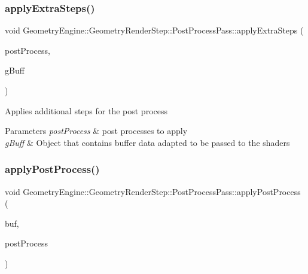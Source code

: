 \subsubsection{\texorpdfstring{applyExtraSteps()}{applyExtraSteps()}}
{\footnotesize\ttfamily void Geometry\+Engine\+::\+Geometry\+Render\+Step\+::\+Post\+Process\+Pass\+::apply\+Extra\+Steps (\begin{DoxyParamCaption}\item[{\mbox{\hyperlink{class_geometry_engine_1_1_geometry_post_process_1_1_post_process}{Geometry\+Post\+Process\+::\+Post\+Process}} $\ast$}]{post\+Process,  }\item[{const \mbox{\hyperlink{class_geometry_engine_1_1_g_buffer_texture_info}{G\+Buffer\+Texture\+Info}} \&}]{g\+Buff }\end{DoxyParamCaption})\hspace{0.3cm}{\ttfamily [protected]}}

Applies additional steps for the post process 
\begin{DoxyParams}{Parameters}
{\em post\+Process} & post processes to apply \\
\hline
{\em g\+Buff} & Object that contains buffer data adapted to be passed to the shaders \\
\hline
\end{DoxyParams}
\mbox{\label{class_geometry_engine_1_1_geometry_render_step_1_1_post_process_pass_ac0f109e5dc7fb598c2613daaff285526}} 
\subsubsection{\texorpdfstring{applyPostProcess()}{applyPostProcess()}}
{\footnotesize\ttfamily void Geometry\+Engine\+::\+Geometry\+Render\+Step\+::\+Post\+Process\+Pass\+::apply\+Post\+Process (\begin{DoxyParamCaption}\item[{\mbox{\hyperlink{class_geometry_engine_1_1_geometry_buffer_1_1_g_buffer}{Geometry\+Buffer\+::\+G\+Buffer}} $\ast$}]{buf,  }\item[{const std\+::list$<$ \mbox{\hyperlink{class_geometry_engine_1_1_geometry_post_process_1_1_post_process}{Geometry\+Post\+Process\+::\+Post\+Process}} $\ast$ $>$ \&}]{post\+Process }\end{DoxyParamCaption})\hspace{0.3cm}{\ttfamily [protected]}}

